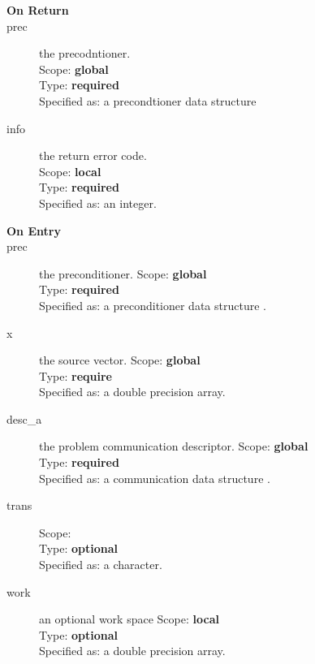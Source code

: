 \begin{description}
\item[\bf On Return]
\item[prec] the precodntioner.\\
Scope: {\bf global} \\
Type: {\bf required}\\
Specified as: a precondtioner data structure \precdata\\
\item[info] the return error code.\\
Scope: {\bf local} \\
Type: {\bf required}\\
Specified as: an integer.\\
\end{description}





\begin{description}
\item[\bf On Entry]
\item[prec] the preconditioner.
Scope: {\bf global} \\
Type: {\bf required}\\
Specified as: a preconditioner data structure \precdata.
\item[x] the source vector.
Scope: {\bf global} \\
Type: {\bf require}\\
Specified as: a double precision array.
\item[desc\_a] the problem communication descriptor.
Scope: {\bf global} \\
Type: {\bf required}\\
Specified as: a communication data structure \descdata.
\item[trans] 
Scope: {\bf } \\
Type: {\bf optional}\\
Specified as: a character.
\item[work] an optional work space
Scope: {\bf local} \\
Type: {\bf optional}\\
Specified as: a double precision array.
\end{description}

